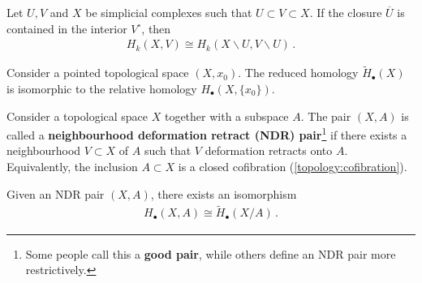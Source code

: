     \begin{theorem}\label{topology:excision_theorem}
        Let $U,V$ and $X$ be simplicial complexes such that $U\subset V\subset X$. If the closure $\overline{U}$ is contained in the interior $V^\circ$, then
        \begin{gather}
            H_k(X,V) \cong H_k(X\backslash U,V\backslash U)\,.
        \end{gather}
    \end{theorem}

    \begin{property}
        Consider a pointed topological space $(X,x_0)$. The reduced homology $\widetilde{H}_\bullet(X)$ is isomorphic to the relative homology $H_\bullet(X,\{x_0\})$.
    \end{property}

    \begin{property}\label{topology:ndr_pair_homology}
        Consider a topological space $X$ together with a subspace $A$. The pair $(X,A)$ is called a \textbf{neighbourhood deformation retract (NDR) pair}\footnote{Some people call this a \textbf{good pair}, while others define an NDR pair more restrictively.} if there exists a neighbourhood $V\subset X$ of $A$ such that $V$ deformation retracts onto $A$. Equivalently, the inclusion $A\subset X$ is a closed cofibration (\cref{topology:cofibration}).

        Given an NDR pair $(X,A)$, there exists an isomorphism
        \begin{gather}
            H_\bullet(X,A)\cong\widetilde{H}_\bullet(X/A)\,.
        \end{gather}
    \end{property}

